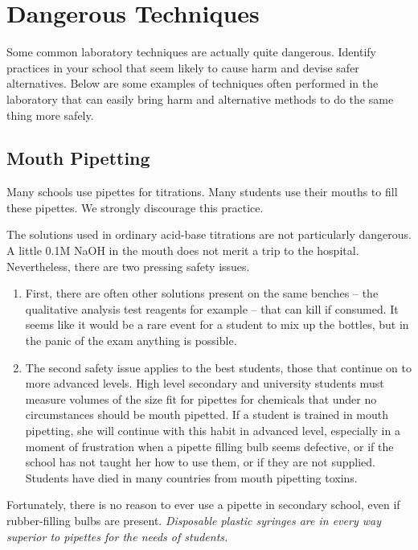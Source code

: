 \chapter{Dangerous Techniques}
\label{cha:dangertech}

Some common laboratory techniques are actually quite dangerous. 
Identify practices in your school 
that seem likely to cause harm and devise safer alternatives. 
Below are some examples of techniques often performed in the laboratory 
that can easily bring harm 
and alternative methods to do the same thing more safely.

\section{Mouth Pipetting} 

Many schools use pipettes for titrations. 
Many students use their mouths to fill these pipettes. 
We strongly discourage this practice.

The solutions used in ordinary acid-base titrations 
are not particularly dangerous. 
A little 0.1M NaOH in the mouth 
does not merit a trip to the hospital. 
Nevertheless, 
there are two pressing safety issues. 

\begin{enumerate}
\item First, 
there are often other solutions present on the same benches – 
the qualitative analysis test reagents for example – 
that can kill if consumed. 
It seems like it would be a rare event 
for a student to mix up the bottles, 
but in the panic of the exam anything is possible.

\item The second safety issue applies to the best students, 
those that continue on to more advanced levels. 
High level secondary and university students 
must measure volumes of the size fit for pipettes 
for chemicals that under no circumstances should be mouth pipetted. 
If a student is trained in mouth pipetting, 
she will continue with this habit in advanced level, 
especially in a moment of frustration 
when a pipette filling bulb seems defective, 
or if the school has not taught her how to use them, 
or if they are not supplied. 
Students have died in many countries from mouth pipetting toxins. 
\end{enumerate}

Fortunately, 
there is no reason to ever use a pipette in secondary school, 
even if rubber-filling bulbs are present. 
\emph{Disposable plastic syringes are in every way superior 
to pipettes for the needs of students. }

